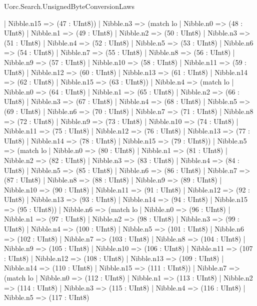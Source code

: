 \begin{lexlean}{Uorc.Search.UnsignedByteConversionLaws}
\begin{semanticmodule}
{      | Nibble.n15 => (47 : UInt8))
    | Nibble.n3 => (match lo
      | Nibble.n0 => (48 : UInt8)
      | Nibble.n1 => (49 : UInt8)
      | Nibble.n2 => (50 : UInt8)
      | Nibble.n3 => (51 : UInt8)
      | Nibble.n4 => (52 : UInt8)
      | Nibble.n5 => (53 : UInt8)
      | Nibble.n6 => (54 : UInt8)
      | Nibble.n7 => (55 : UInt8)
      | Nibble.n8 => (56 : UInt8)
      | Nibble.n9 => (57 : UInt8)
      | Nibble.n10 => (58 : UInt8)
      | Nibble.n11 => (59 : UInt8)
      | Nibble.n12 => (60 : UInt8)
      | Nibble.n13 => (61 : UInt8)
      | Nibble.n14 => (62 : UInt8)
      | Nibble.n15 => (63 : UInt8))
    | Nibble.n4 => (match lo
      | Nibble.n0 => (64 : UInt8)
      | Nibble.n1 => (65 : UInt8)
      | Nibble.n2 => (66 : UInt8)
      | Nibble.n3 => (67 : UInt8)
      | Nibble.n4 => (68 : UInt8)
      | Nibble.n5 => (69 : UInt8)
      | Nibble.n6 => (70 : UInt8)
      | Nibble.n7 => (71 : UInt8)
      | Nibble.n8 => (72 : UInt8)
      | Nibble.n9 => (73 : UInt8)
      | Nibble.n10 => (74 : UInt8)
      | Nibble.n11 => (75 : UInt8)
      | Nibble.n12 => (76 : UInt8)
      | Nibble.n13 => (77 : UInt8)
      | Nibble.n14 => (78 : UInt8)
      | Nibble.n15 => (79 : UInt8))
    | Nibble.n5 => (match lo
      | Nibble.n0 => (80 : UInt8)
      | Nibble.n1 => (81 : UInt8)
      | Nibble.n2 => (82 : UInt8)
      | Nibble.n3 => (83 : UInt8)
      | Nibble.n4 => (84 : UInt8)
      | Nibble.n5 => (85 : UInt8)
      | Nibble.n6 => (86 : UInt8)
      | Nibble.n7 => (87 : UInt8)
      | Nibble.n8 => (88 : UInt8)
      | Nibble.n9 => (89 : UInt8)
      | Nibble.n10 => (90 : UInt8)
      | Nibble.n11 => (91 : UInt8)
      | Nibble.n12 => (92 : UInt8)
      | Nibble.n13 => (93 : UInt8)
      | Nibble.n14 => (94 : UInt8)
      | Nibble.n15 => (95 : UInt8))
    | Nibble.n6 => (match lo
      | Nibble.n0 => (96 : UInt8)
      | Nibble.n1 => (97 : UInt8)
      | Nibble.n2 => (98 : UInt8)
      | Nibble.n3 => (99 : UInt8)
      | Nibble.n4 => (100 : UInt8)
      | Nibble.n5 => (101 : UInt8)
      | Nibble.n6 => (102 : UInt8)
      | Nibble.n7 => (103 : UInt8)
      | Nibble.n8 => (104 : UInt8)
      | Nibble.n9 => (105 : UInt8)
      | Nibble.n10 => (106 : UInt8)
      | Nibble.n11 => (107 : UInt8)
      | Nibble.n12 => (108 : UInt8)
      | Nibble.n13 => (109 : UInt8)
      | Nibble.n14 => (110 : UInt8)
      | Nibble.n15 => (111 : UInt8))
    | Nibble.n7 => (match lo
      | Nibble.n0 => (112 : UInt8)
      | Nibble.n1 => (113 : UInt8)
      | Nibble.n2 => (114 : UInt8)
      | Nibble.n3 => (115 : UInt8)
      | Nibble.n4 => (116 : UInt8)
      | Nibble.n5 => (117 : UInt8)
}
\end{semanticmodule}
\end{lexlean}
